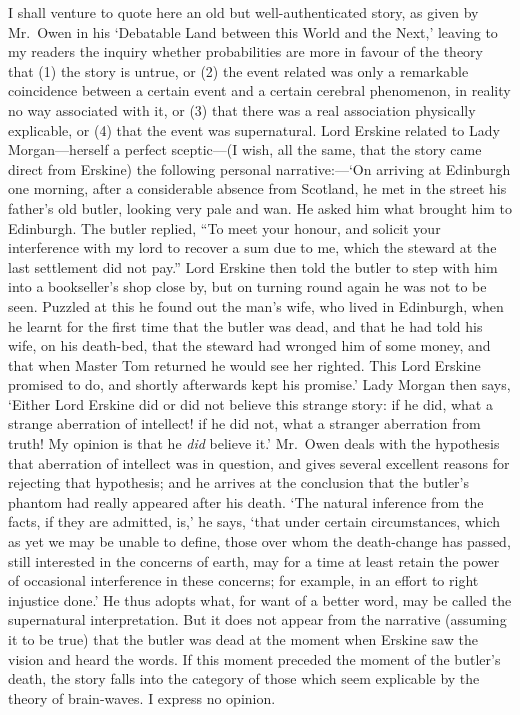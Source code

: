 \documentclass[letterpaper,12pt,oneside,openany]{memoir}
\begin{document}
I shall venture to quote here an old but well-authenticated
story, as given by Mr.~Owen in his
`Debatable Land between this World and the Next,'
leaving to my readers the inquiry whether probabilities
are more in favour of the theory that (1) the story is
untrue, or (2) the event related was only a remarkable
coincidence between a certain event and a certain
cerebral phenomenon, in reality no way associated with
it, or (3) that there was a real association physically
explicable, or (4) that the event was supernatural.
Lord Erskine related to Lady Morgan---herself a
perfect sceptic---(I wish, all the same, that the story
came direct from Erskine) the following personal
narrative:---`On arriving at Edinburgh one morning,
after a considerable absence from Scotland, he met in
the street his father's old butler, looking very pale and
wan. He asked him what brought him to Edinburgh.
The butler replied, ``To meet your honour, and solicit
your interference with my lord to recover a sum due
to me, which the steward at the last settlement did not
pay.'' Lord Erskine then told the butler to step with
him into a bookseller's shop close by, but on turning
round again he was not to be seen. Puzzled at this he
found out the man's wife, who lived in Edinburgh,
when he learnt for the first time that the butler was
dead, and that he had told his wife, on his death-bed,
that the steward had wronged him of some money, and
that when Master Tom returned he would see her
righted. This Lord Erskine promised to do, and
shortly afterwards kept his promise.' Lady Morgan
then says, `Either Lord Erskine did or did not believe
this strange story: if he did, what a strange aberration
of intellect! if he did not, what a stranger aberration
from truth! My opinion is that he \emph{did} believe it.'
Mr.~Owen deals with the hypothesis that aberration of
intellect was in question, and gives several excellent
reasons for rejecting that hypothesis; and he arrives
at the conclusion that the butler's phantom had really
appeared after his death. `The natural inference from
the facts, if they are admitted, is,' he says, `that under
certain circumstances, which as yet we may be unable
to define, those over whom the death-change has
passed, still interested in the concerns of earth, may
for a time at least retain the power of occasional
interference in these concerns; for example, in an
effort to right injustice done.' He thus adopts what,
for want of a better word, may be called the supernatural
interpretation. But it does not appear from
the narrative (assuming it to be true) that the butler
was dead at the moment when Erskine saw the vision
and heard the words. If this moment preceded the
moment of the butler's death, the story falls into the
category of those which seem explicable by the theory
of brain-waves. I express no opinion.
\end{document}

